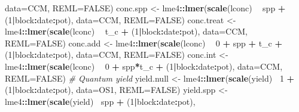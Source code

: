 \documentclass[]{scrartcl}
\newenvironment{Shaded}{\begin{snugshade}}{\end{snugshade}}
\newcommand{\CommentTok}[1]{\textcolor[rgb]{0.56,0.35,0.01}{\textit{#1}}}
\newcommand{\DataTypeTok}[1]{\textcolor[rgb]{0.13,0.29,0.53}{#1}}
\newcommand{\DecValTok}[1]{\textcolor[rgb]{0.00,0.00,0.81}{#1}}
\newcommand{\KeywordTok}[1]{\textcolor[rgb]{0.13,0.29,0.53}{\textbf{#1}}}
\newcommand{\NormalTok}[1]{#1}
\newcommand{\OperatorTok}[1]{\textcolor[rgb]{0.81,0.36,0.00}{\textbf{#1}}}
\newcommand{\OtherTok}[1]{\textcolor[rgb]{0.56,0.35,0.01}{#1}}
\newcommand{\StringTok}[1]{\textcolor[rgb]{0.31,0.60,0.02}{#1}}
\begin{document}
\begin{Shaded}
\begin{Highlighting}[]
{{{{{{{{{{{{{{{{{{{{{{{{{{{{{{{{{{{{{{{{{{{{                            \DataTypeTok{data=}\NormalTok{CCM, }\DataTypeTok{REML=}\OtherTok{FALSE}\NormalTok{)}
\NormalTok{    conc.spp <-}\StringTok{ }\NormalTok{lme4}\OperatorTok{::}\KeywordTok{lmer}\NormalTok{(}\KeywordTok{scale}\NormalTok{(lconc) }\OperatorTok{~}\StringTok{ }\NormalTok{spp }\OperatorTok{+}\StringTok{ }\NormalTok{(}\DecValTok{1}\OperatorTok{|}\NormalTok{block}\OperatorTok{:}\NormalTok{date}\OperatorTok{:}\NormalTok{pot), }
                           \DataTypeTok{data=}\NormalTok{CCM, }\DataTypeTok{REML=}\OtherTok{FALSE}\NormalTok{)}
\NormalTok{    conc.treat <-}\StringTok{ }\NormalTok{lme4}\OperatorTok{::}\KeywordTok{lmer}\NormalTok{(}\KeywordTok{scale}\NormalTok{(lconc) }\OperatorTok{~}\StringTok{ }\NormalTok{t_c }\OperatorTok{+}\StringTok{ }\NormalTok{(}\DecValTok{1}\OperatorTok{|}\NormalTok{block}\OperatorTok{:}\NormalTok{date}\OperatorTok{:}\NormalTok{pot), }
                             \DataTypeTok{data=}\NormalTok{CCM, }\DataTypeTok{REML=}\OtherTok{FALSE}\NormalTok{)}
\NormalTok{    conc.add <-}\StringTok{ }\NormalTok{lme4}\OperatorTok{::}\KeywordTok{lmer}\NormalTok{(}\KeywordTok{scale}\NormalTok{(lconc) }\OperatorTok{~}\StringTok{ }\DecValTok{0} \OperatorTok{+}\StringTok{ }\NormalTok{spp }\OperatorTok{+}\StringTok{ }\NormalTok{t_c }\OperatorTok{+}\StringTok{ }\NormalTok{(}\DecValTok{1}\OperatorTok{|}\NormalTok{block}\OperatorTok{:}\NormalTok{date}\OperatorTok{:}\NormalTok{pot), }
                           \DataTypeTok{data=}\NormalTok{CCM, }\DataTypeTok{REML=}\OtherTok{FALSE}\NormalTok{)}
\NormalTok{    conc.int <-}\StringTok{ }\NormalTok{lme4}\OperatorTok{::}\KeywordTok{lmer}\NormalTok{(}\KeywordTok{scale}\NormalTok{(lconc) }\OperatorTok{~}\StringTok{ }\DecValTok{0} \OperatorTok{+}\StringTok{ }\NormalTok{spp}\OperatorTok{*}\NormalTok{t_c }\OperatorTok{+}\StringTok{ }\NormalTok{(}\DecValTok{1}\OperatorTok{|}\NormalTok{block}\OperatorTok{:}\NormalTok{date}\OperatorTok{:}\NormalTok{pot),}
                           \DataTypeTok{data=}\NormalTok{CCM, }\DataTypeTok{REML=}\OtherTok{FALSE}\NormalTok{)}
  \CommentTok{# Quantum yield}
\NormalTok{    yield.null <-}\StringTok{ }\NormalTok{lme4}\OperatorTok{::}\KeywordTok{lmer}\NormalTok{(}\KeywordTok{scale}\NormalTok{(yield)}\OperatorTok{~}\StringTok{ }\DecValTok{1} \OperatorTok{+}\StringTok{ }\NormalTok{(}\DecValTok{1}\OperatorTok{|}\NormalTok{block}\OperatorTok{:}\NormalTok{date}\OperatorTok{:}\NormalTok{pot), }
                             \DataTypeTok{data=}\NormalTok{OS1, }\DataTypeTok{REML=}\OtherTok{FALSE}\NormalTok{)}
\NormalTok{    yield.spp <-}\StringTok{ }\NormalTok{lme4}\OperatorTok{::}\KeywordTok{lmer}\NormalTok{(}\KeywordTok{scale}\NormalTok{(yield)}\OperatorTok{~}\StringTok{ }\NormalTok{spp }\OperatorTok{+}\StringTok{ }\NormalTok{(}\DecValTok{1}\OperatorTok{|}\NormalTok{block}\OperatorTok{:}\NormalTok{date}\OperatorTok{:}\NormalTok{pot), }
}}}}}}}}}}}}}}}}}}}}}}}}}}}}}}}}}}}}}}}}}}}}
\end{Highlighting}
\end{Shaded}
\end{document}
